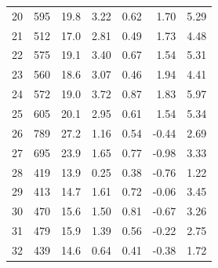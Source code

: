 \begin{longtable}{rrrrrrr}
  20  &  595 &  19.8 &    3.22 &   0.62 &     1.70 &    5.29 \\
  21  &  512 &  17.0 &    2.81 &   0.49 &     1.73 &    4.48 \\
  22  &  575 &  19.1 &    3.40 &   0.67 &     1.54 &    5.31 \\
  23  &  560 &  18.6 &    3.07 &   0.46 &     1.94 &    4.41 \\
  24  &  572 &  19.0 &    3.72 &   0.87 &     1.83 &    5.97 \\
  25  &  605 &  20.1 &    2.95 &   0.61 &     1.54 &    5.34 \\
  26  &  789 &  27.2 &    1.16 &   0.54 &    -0.44 &    2.69 \\
  27  &  695 &  23.9 &    1.65 &   0.77 &    -0.98 &    3.33 \\
  28  &  419 &  13.9 &    0.25 &   0.38 &    -0.76 &    1.22 \\
  29  &  413 &  14.7 &    1.61 &   0.72 &    -0.06 &    3.45 \\
  30  &  470 &  15.6 &    1.50 &   0.81 &    -0.67 &    3.26 \\
  31  &  479 &  15.9 &    1.39 &   0.56 &    -0.22 &    2.75 \\
  32  &  439 &  14.6 &    0.64 &   0.41 &    -0.38 &    1.72 \\
\end{longtable}
